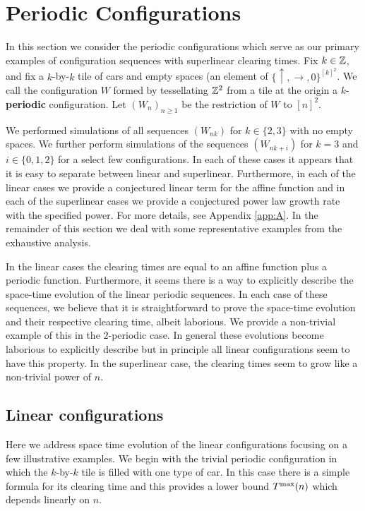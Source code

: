 \documentclass[reqno]{amsart}
\begin{document}
\section{Periodic Configurations}
In this section we consider the periodic configurations which serve as our primary examples of configuration sequences with superlinear clearing times. Fix $k \in \mathbb{Z}$, and fix a $k$-by-$k$ tile of cars and empty spaces (an element of $\{ \uparrow, \rightarrow,0 \}^{[k]^2}$. We call the configuration $W$ formed by tessellating $\mathbb{Z}^2$ from a tile at the origin a $k$-\textbf{periodic} configuration. Let $(W_n)_{n \geq 1}$ be the restriction of $W$ to $[n]^2$.

We performed simulations of all sequences $(W_{nk})$ for $k \in \{2,3\}$ with no empty spaces. We further perform simulations of the sequences $(W_{nk+i})$ for $k = 3$ and $i \in \{0,1,2\}$ for a select few configurations. In each of these cases it appears that it is easy to separate between linear and superlinear. Furthermore, in each of the linear cases we provide a conjectured linear term for the affine function and in each of the superlinear cases we provide a conjectured power law growth rate with the specified power. For more details, see Appendix \ref{app:A}. In the remainder of this section we deal with some representative examples from the exhaustive analysis.

In the linear cases the clearing times are equal to an affine function plus a periodic function. Furthermore, it seems there is a way to explicitly describe the space-time evolution of the linear periodic sequences. In each case of these sequences, we believe that it is straightforward to prove the space-time evolution and their respective clearing time, albeit laborious. We provide a non-trivial example of this in the $2$-periodic case. In general these evolutions become laborious to explicitly describe but in principle all linear configurations seem to have this property. In the superlinear case, the clearing times seem to grow like a non-trivial power of $n$.




\subsection{Linear configurations} \label{sec:linearconfigs}
Here we address space time evolution of the linear configurations focusing on a few illustrative examples.
We begin with the trivial periodic configuration in which the $k $-by-$ k$ tile is filled with one type of car. In this case there is a simple formula for its clearing time and this provides a lower bound $T^{\text{\rm max}}(n)$ which depends linearly on $n$.
\end{document}
